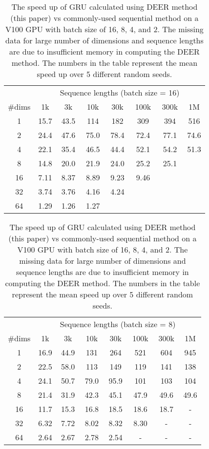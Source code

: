 \begin{table}
\caption{
    The speed up of GRU calculated using DEER method (this paper) vs commonly-used sequential method on a V100 GPU with batch size of 16, 8, 4, and 2.
    The missing data for large number of dimensions and sequence lengths are due to insufficient memory in computing the DEER method.
    The numbers in the table represent the mean speed up over 5 different random seeds.}
\label{apptab:fwd-speedup}
\begin{center}
\begin{tabular}{|c|ccccccc|}
\hline
~ & ~ & \multicolumn{5}{c}{Sequence lengths (batch size = 16)} & ~ \\
\#dims & 1k & 3k & 10k & 30k & 100k & 300k & 1M \\ \hline
1 & 15.7 & 43.5 & 114 & 182 & 309 & 394 & 516 \\ 2 & 24.4 & 47.6 & 75.0 & 78.4 & 72.4 & 77.1 & 74.6 \\ 4 & 22.1 & 35.4 & 46.5 & 44.4 & 52.1 & 54.2 & 51.3 \\ 8 & 14.8 & 20.0 & 21.9 & 24.0 & 25.2 & 25.1 & \text{-} \\ 16 & 7.11 & 8.37 & 8.89 & 9.23 & 9.46 & \text{-} & \text{-} \\ 32 & 3.74 & 3.76 & 4.16 & 4.24 & \text{-} & \text{-} & \text{-} \\ 64 & 1.29 & 1.26 & 1.27 & \text{-} & \text{-} & \text{-} & \text{-} \\ \hline
\end{tabular}

\begin{tabular}{|c|ccccccc|}
\hline
~ & ~ & \multicolumn{5}{c}{Sequence lengths (batch size = 8)} & ~ \\
\#dims & 1k & 3k & 10k & 30k & 100k & 300k & 1M \\
\hline
1 & 16.9 & 44.9 & 131 & 264 & 521 & 604 & 945 \\
2 & 22.5 & 58.0 & 113 & 149 & 119 & 141 & 138 \\
4 & 24.1 & 50.7 & 79.0 & 95.9 & 101 & 103 & 104 \\
8 & 21.4 & 31.9 & 42.3 & 45.1 & 47.9 & 49.6 & 49.6 \\
16 & 11.7 & 15.3 & 16.8 & 18.5 & 18.6 & 18.7 & - \\
32 & 6.32 & 7.72 & 8.02 & 8.32 & 8.30 & - & - \\
64 & 2.64 & 2.67 & 2.78 & 2.54 & - & - & - \\
\hline
\end{tabular}


\end{center}
\end{table}
